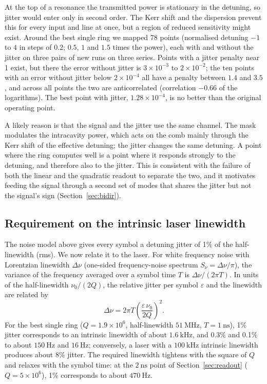 At the top of a resonance the transmitted power is stationary in the detuning, so jitter would enter only in second order. The Kerr
shift and the dispersion prevent this for every input and line at once, but a region of reduced sensitivity might exist. Around the
best single ring we mapped 78 points (normalised detuning $-1$ to $4$ in steps of $0.2$; $0.5$, $1$ and $1.5$ times the power), each
with and without the jitter on three pairs of new runs on three series. Points with a jitter penalty near 1 exist, but there the
error without jitter is $3\times10^{-3}$ to $2\times10^{-2}$; the ten points with an error without jitter below $2\times10^{-4}$ all
have a penalty between $1.4$ and $3.5$, and across all points the two are anticorrelated (correlation $-0.66$ of the logarithms).
The best point with jitter, $1.28\times10^{-4}$, is no better than the original operating point.

A likely reason is that the signal and the jitter use the same channel. The mask modulates the intracavity power, which acts on the comb
mainly through the Kerr shift of the effective detuning; the jitter changes the same detuning. A point where the ring computes well is
a point where it responds strongly to the detuning, and therefore also to the jitter. This is consistent with the failure of both
the linear and the quadratic readout to separate the two, and it motivates feeding the signal through a second set of modes that shares the jitter but not the signal's
sign (Section~\ref{sec:bidir}).

\subsection{Requirement on the intrinsic laser linewidth}\label{sec:laser}

The noise model above gives every symbol a detuning jitter of 1\% of the half-linewidth (rms). We now relate it to the laser.
For white frequency noise with Lorentzian linewidth $\Delta\nu$ (one-sided frequency-noise spectrum $S_\nu=\Delta\nu/\pi$), the
variance of the frequency averaged over a symbol time $T$ is $\Delta\nu/(2\pi T)$. In units of the half-linewidth $\nu_0/(2Q)$, the
relative jitter per symbol $\varepsilon$ and the linewidth are related by
\begin{equation}
\Delta\nu=2\pi T\left(\frac{\varepsilon\,\nu_0}{2Q}\right)^{2}.
\label{eq:linewidth}
\end{equation}
For the best single ring ($Q=1.9\times10^{6}$, half-linewidth $51~\mathrm{MHz}$, $T=1~\mathrm{ns}$), 1\% jitter corresponds to an
intrinsic linewidth of about $1.6~\mathrm{kHz}$, and 0.3\% and 0.1\% to about $150~\mathrm{Hz}$ and $16~\mathrm{Hz}$; conversely, a
laser with a $100~\mathrm{kHz}$ intrinsic linewidth produces about 8\% jitter. The required linewidth tightens with the square of $Q$
and relaxes with the symbol time: at the $2~\mathrm{ns}$ point of Section~\ref{sec:readout} ($Q=5\times10^{6}$), 1\% corresponds to
about $470~\mathrm{Hz}$.

